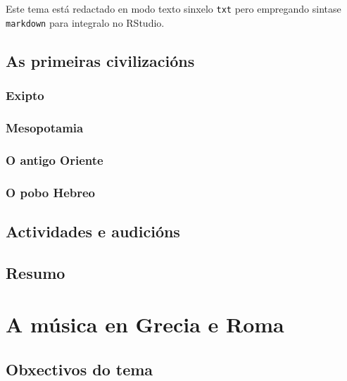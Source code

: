 \documentclass[a4paper, twoside]{templates/ociamthesis}
\begin{document}
Este tema está redactado en modo texto sinxelo \texttt{txt} pero empregando sintase \texttt{markdown} para integralo no RStudio.

\hypertarget{as-primeiras-civilizaciuxf3ns}{%
\section{As primeiras civilizacións}\label{as-primeiras-civilizaciuxf3ns}}

\hypertarget{exipto}{%
\subsection{Exipto}\label{exipto}}

\hypertarget{mesopotamia}{%
\subsection{Mesopotamia}\label{mesopotamia}}

\hypertarget{o-antigo-oriente}{%
\subsection{O antigo Oriente}\label{o-antigo-oriente}}

\hypertarget{o-pobo-hebreo}{%
\subsection{O pobo Hebreo}\label{o-pobo-hebreo}}

\hypertarget{actividades-e-audiciuxf3ns}{%
\section{Actividades e audicións}\label{actividades-e-audiciuxf3ns}}

\hypertarget{resumo}{%
\section{Resumo}\label{resumo}}

\hypertarget{a-muxfasica-en-grecia-e-roma}{%
\chapter{A música en Grecia e Roma}\label{a-muxfasica-en-grecia-e-roma}}

\minitoc 

\hypertarget{obxectivos-do-tema-1}{%
\section{Obxectivos do tema}\label{obxectivos-do-tema-1}}
\end{document}
